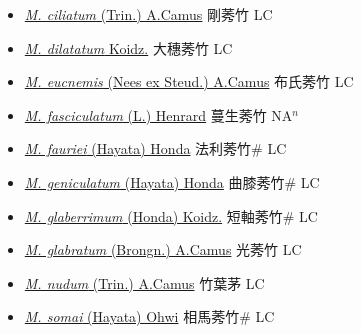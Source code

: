 \begin{itemize}
  \begin{itemize}
        \item[] \href{http://www.theplantlist.org/tpl1.1/search?q=Microstegium+ciliatum}{\textit{M. ciliatum} (Trin.) A.Camus}   剛莠竹 LC
        \item[] \href{http://www.theplantlist.org/tpl1.1/search?q=Microstegium+dilatatum}{\textit{M. dilatatum} Koidz.}   大穗莠竹 LC
        \item[] \href{http://www.theplantlist.org/tpl1.1/search?q=Microstegium+eucnemis}{\textit{M. eucnemis} (Nees ex Steud.) A.Camus}   布氏莠竹 LC
        \item[] \href{http://www.theplantlist.org/tpl1.1/search?q=Microstegium+fasciculatum}{\textit{M. fasciculatum} (L.) Henrard}   蔓生莠竹 NA$^n$
        \item[] \href{http://www.theplantlist.org/tpl1.1/search?q=Microstegium+fauriei}{\textit{M. fauriei} (Hayata) Honda}   法利莠竹\# LC
        \item[] \href{http://www.theplantlist.org/tpl1.1/search?q=Microstegium+geniculatum}{\textit{M. geniculatum} (Hayata) Honda}   曲膝莠竹\# LC
        \item[] \href{http://www.theplantlist.org/tpl1.1/search?q=Microstegium+glaberrimum}{\textit{M. glaberrimum} (Honda) Koidz.}   短軸莠竹\# LC
        \item[] \href{http://www.theplantlist.org/tpl1.1/search?q=Microstegium+glabratum}{\textit{M. glabratum} (Brongn.) A.Camus}   光莠竹 LC
        \item[] \href{http://www.theplantlist.org/tpl1.1/search?q=Microstegium+nudum}{\textit{M. nudum} (Trin.) A.Camus}   竹葉茅 LC
        \item[] \href{http://www.theplantlist.org/tpl1.1/search?q=Microstegium+somai}{\textit{M. somai} (Hayata) Ohwi}   相馬莠竹\# LC

\end{itemize}
\end{itemize}
